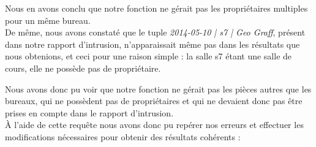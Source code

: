 Nous en avons conclu que notre fonction ne gérait pas les propriétaires multiples pour un même bureau.\\

De même, nous avons constaté que le tuple \textit{2014-05-10 | s7 | Geo Graff}, présent dans notre rapport d'intrusion, n'apparaissait même pas dans les résultats que nous obtenions, et ceci pour une raison simple : la salle s7 étant une salle de cours, elle ne possède pas de propriétaire.

Nous avons donc pu voir que notre fonction ne gérait pas les pièces autres que les bureaux, qui ne possèdent pas de propriétaires et qui ne devaient donc pas être prises en compte dans le rapport d'intrusion.\\

À l'aide de cette requête nous avons donc pu repérer nos erreurs et effectuer les modifications nécessaires pour obtenir des résultats cohérents :\\

\inputminted[tabsize=4,linenos,fontsize=\small]{sql}{code/3.sql}